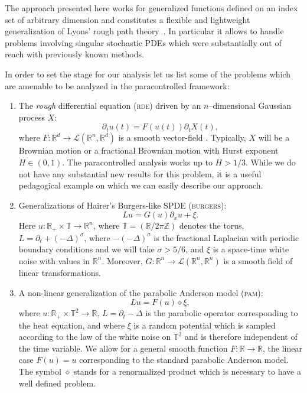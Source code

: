 \documentclass[a4paper,11pt]{article}
\theoremstyle{remark}
\newcommand{\R}{\mathbb{R}}
\newcommand{\Z}{\mathbb{Z}}
\newcommand{\Lcal}{\mathcal{L}}
\begin{document}
The approach presented here works for generalized functions defined on an index set of arbitrary dimension and constitutes a flexible and lightweight generalization of Lyons' rough path theory~\cite{Lyons1998}. In particular it allows to handle problems involving singular stochastic PDEs which were substantially out of reach with previously known methods.

In order to set the stage for our analysis let us list some of the problems which are amenable to be analyzed in the paracontrolled framework:
\begin{enumerate}%
  \item The \emph{rough} differential equation (\textsc{rde}) driven by an $n$--dimensional Gaussian process $X$: 
  \[
     \partial_t u(t) = F(u(t)) \partial_t X(t),%
  \]
  where $F\colon\R^{d} \rightarrow \Lcal(\R^n, \R^d)$ is a smooth vector-field . Typically, $X$ will be a Brownian motion or a fractional Brownian motion with Hurst exponent $H\in(0,1)$. The paracontrolled analysis works up to $H>1/3$.  While we do not have any substantial new results for this problem, it is a useful pedagogical example on which we can easily describe our approach.
  
  \item Generalizations of Hairer's Burgers-like SPDE (\textsc{burgers}):
  \[
     L u = G(u) \partial_x u + \xi.
  \]
  Here $u\colon \R_+ \times \mathbb{T} \rightarrow \R^n$, where $\mathbb{T} = (\R/2\pi \Z)$ denotes the torus, $L = \partial_t + (-\Delta)^{\sigma}$, where $-(-\Delta)^\sigma$ is the fractional Laplacian with periodic boundary conditions and we will take $\sigma > 5/6$, and $\xi$ is a space-time white noise with values in $\R^n$. Moreover, $G\colon \R^n \rightarrow \Lcal (\R^n, \R^n)$ is a smooth field of linear transformations.
  
  \item A non-linear generalization of the parabolic Anderson model (\textsc{pam}):
  \[
     L u = F(u) \diamond \xi,
  \]
  where $u \colon \R_+ \times \mathbb{T}^2 \rightarrow \R$, $L = \partial_t - \Delta$ is the parabolic operator corresponding to the heat equation, and where $\xi$ is a random potential which is sampled according to the law of the white noise on  $\mathbb{T}^2$ and is therefore independent of the time variable. We allow for a general smooth function $F\colon \R \rightarrow \R$, the linear case $F(u)=u$ corresponding to the standard parabolic Anderson model. The symbol $\diamond$ stands for a renormalized product which is necessary to have a well defined problem. 
  

\end{enumerate}
\end{document}
